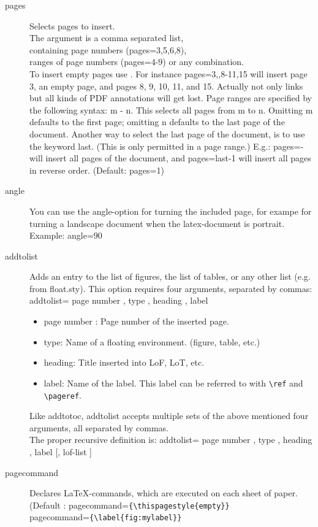 	\begin{description}
	\item[pages] 	Selects pages to insert. \\
			The argument is a comma separated list, \\
			containing page numbers (pages={3,5,6,8}), \\
			 ranges of page numbers (pages={4-9}) or any combination. \\
			To insert empty pages use {}. For instance pages={3,{},8-11,15} will insert page 3, an empty page, 
			and pages 8, 9, 10, 11, and 15.
			Actually not only links but all kinds of PDF annotations will get lost. 
			Page ranges are specified by the following syntax: m - n. 
			This selects all pages from m to n. Omitting m defaults to the first page; 
			omitting n defaults to the last page of the document. 
			Another way to select the last page of the document, is to use the keyword last. 
			(This is only permitted in a page range.) 
			E.g.: pages=- will insert all pages of the document, and pages=last-1 will insert all pages 
			in reverse order. (Default: pages=1) 
	\item[angle]	 You can use the angle-option for turning the included page, 
			for exampe for turning a landscape document when the latex-document is portrait. 
			Example: angle=90  
	\item[addtolist]	Adds an entry to the list of figures, 
			the list of tables, or any other list (e.g. from float.sty). 
			This option requires four arguments, separated by commas:
			addtolist={ page number , type , heading , label }
			\begin{itemize}
			\item page number : Page number of the inserted page.
			\item type: Name of a floating environment. (figure, table, etc.)
			\item heading: Title inserted into LoF, LoT, etc.
			\item label: Name of the label. This label can be referred to with \verb|\ref| and \verb|\pageref|.
			\end{itemize}
			Like addtotoc, addtolist accepts multiple sets of the above mentioned four arguments, all separated by commas. \\
			The proper recursive definition is: addtolist={ page number , type , heading , label [, lof-list ] }
	\item[pagecommand]  Declares LaTeX-commands, which are executed on each sheet of paper. 
			(Default : pagecommand=\verb|{\thispagestyle{empty}}| \\
			pagecommand=\verb|{\label{fig:mylabel}}|
	\end{description}
	
